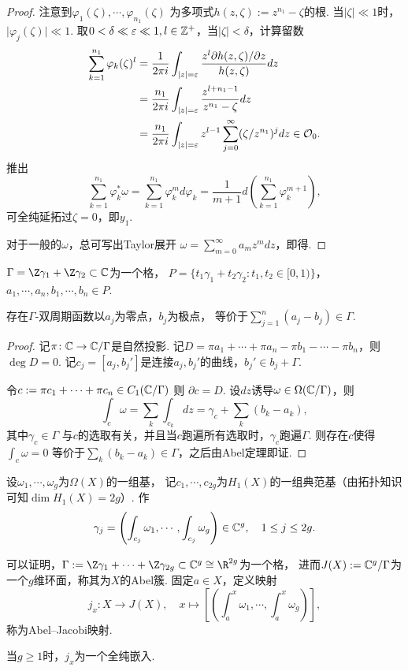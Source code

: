 \begin{proof}
	注意到$\varphi_1(\zeta),\cdots,\varphi_{n_1}(\zeta)$
    为多项式$h(z,\zeta):=z^{n_1}-\zeta$的根.
	当$\vert \zeta\vert \ll 1$时，$\vert \varphi_j(\zeta)\vert \ll 1$. 
    取$0<\delta \ll \varepsilon \ll 1,l\in\mathbb{Z^+}$，当$\vert \zeta\vert <\delta$，计算留数
	\begin{align*}
		\sum\limits_{k=1}^{n_1} \varphi_k(\zeta)^l
        &=\frac{1}{2\pi i} \int_{\vert z\vert=\varepsilon} 
        \frac{z^l \partial h(z,\zeta)/\partial z}{h(z,\zeta)} dz\\
		&=\frac{n_1}{2\pi i} \int_{\vert z\vert=\varepsilon} 
        \frac{z^{l+n_1-1}}{z^{n_1}-\zeta}dz\\
		&=\frac{n_1}{2\pi i} \int_{\vert z\vert=\varepsilon} 
        z^{l-1} \sum\limits_{j=0}^\infty (\zeta/z^{n_1})^j dz\in \mathcal{O}_0.
	\end{align*}
	推出
	\[\sum_{k=1}^{n_1} \varphi_k^*\omega=\sum_{k=1}^{n_1} \varphi_k^md\varphi_k 
    =\frac{1}{m+1} d\left(\sum_{k=1}^{n_1} \varphi_k^{m+1}\right),\]
    可全纯延拓过$\zeta=0$，即$y_1$.

	对于一般的$\omega$，总可写出Taylor展开
    $\omega=\sum\limits_{m=0}^\infty a_m z^m dz$，即得.
\end{proof}

\begin{proposition}
	$\Gamma=\Z \gamma_1+\Z \gamma_2\subset \bbC$为一个格，
    $P=\{t_1\gamma_1+t_2\gamma_2: t_1,t_2\in [0,1)\}$，
    $a_1,\cdots,a_n,b_1,\cdots,b_n\in P$.

	存在$\Gamma$-双周期函数以$a_j$为零点，$b_j$为极点，
    等价于$\sum\limits_{j=1}^n (a_j-b_j)\in \Gamma$.
\end{proposition}

\begin{proof}
	记$\pi\colon\mathbb{C} \rightarrow \mathbb{C}/\Gamma$是自然投影. 
    记$D=\pi a_1+\cdots+\pi a_n-\pi b_1-\cdots-\pi b_n$，则$\deg D=0$. 
    记$c_j=[a_j,b_j']$是连接$a_j,b_j'$的曲线，$b_j'\in b_j+\Gamma$.

	令$c:=\pi c_1 +\cdots +\pi c_n\in C_1(\mathbb{C}/\Gamma)$ 则 $\partial c=D$. 
    设$dz$诱导$\omega\in \Omega(\mathbb{C}/\Gamma)$，则
    \[\int_c \omega=\sum_k \int_{c_k} dz=\gamma_c+\sum_k (b_k-a_k),\]
    其中$\gamma_c\in\Gamma$ 与$c$的选取有关，并且当$c$跑遍所有选取时，$\gamma_c$跑遍$\Gamma$.
    则存在$c$使得$\int_c \omega=0$ 等价于$\sum\limits_k (b_k-a_k)\in \Gamma$，之后由Abel定理即证.
\end{proof}

\begin{remark}
	设$\omega_1,\cdots,\omega_g$为$\Omega(X)$的一组基，
    记$c_1,\cdots,c_{2g}$为$H_1(X)$的一组典范基（由拓扑知识可知$\dim H_1(X)=2g$）. 作
    \[\gamma_j=\left( \int_{c_j} \omega_1,\cdots, \int_{c_j} \omega_g\right) \in \mathbb{C}^g, \quad 1\leq j\leq 2g.\]

	可以证明，$\Gamma:=\Z \gamma_1+\cdots+\Z \gamma_{2g} 
    \subset \bbC^g \cong \R^{2g}$为一个格，
    进而$J(X):=\mathbb{C}^g / \Gamma$为一个$g$维环面，称其为$X$的Abel簇.
	固定$a\in X$，定义映射\[j_x\colon X\rightarrow J(X), \quad 
    x\mapsto \left[\left( \int_a^x \omega_1, \cdots, \int_a^x \omega_g \right)\right],\]
    称为Abel--Jacobi映射.

	当$g\geq 1$时，$j_x$为一个全纯嵌入.		
\end{remark}
